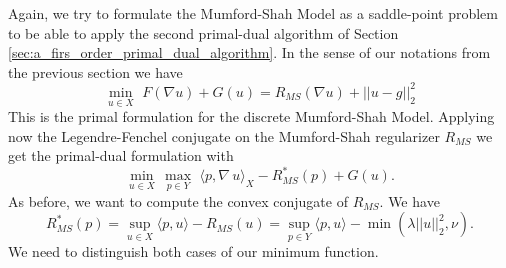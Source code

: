         Again, we try to formulate the Mumford-Shah Model as a saddle-point problem to be able to apply the second primal-dual algorithm of Section \ref{sec:a_firs_order_primal_dual_algorithm}. In the sense of our notations from the previous section we have
            \begin{equation}
                \min_{u \in X}\,\, F(\nabla u) + G(u) = R_{MS}(\nabla u) + ||u - g||_{2}^{2}
                \label{eq:primal_mumford_shah_model}
            \end{equation}
        This is the primal formulation for the discrete Mumford-Shah Model. Applying now the Legendre-Fenchel conjugate on the Mumford-Shah regularizer $R_{MS}$ we get the primal-dual formulation with
            \begin{equation}
                \min_{u \in X}\, \max_{p \in Y}\,\, \langle p, \nabla \, u \rangle_{X} - R_{MS}^{\ast}(p) + G(u).%
            \label{eq:primal_dual_mumford_shah_model}
            \end{equation}
        As before, we want to compute the convex conjugate of $R_{MS}$. We have
            $$
                R_{MS}^{\ast}(p) = \sup_{u \in X} \langle p, u \rangle - R_{MS}(u) = \sup_{p \in Y} \langle p, u \rangle - \min(\lambda ||u||_{2}^{2}, \nu).
            $$
        We need to distinguish both cases of our minimum function.
